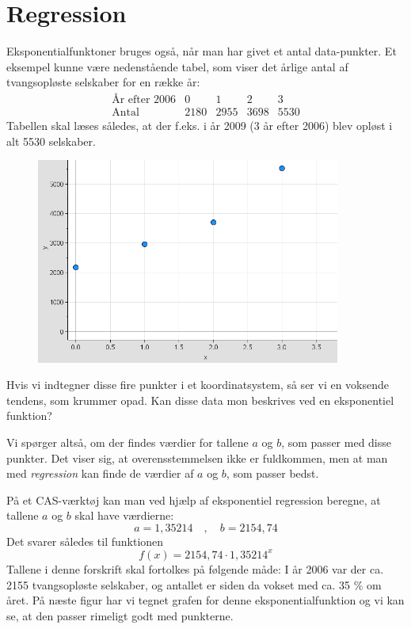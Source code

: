 \documentclass[12pt,oneside,a4paper]{article}
\theoremstyle{plain}
\begin{document}
\section*{Regression}
Eksponentialfunktoner bruges også, når man har givet et antal
data-punkter. Et eksempel kunne være nedenstående tabel, som viser det årlige
antal af tvangsopløste selskaber for en række år:
$$
\begin{array}{l|c|c|c|c}
    \mbox{År efter 2006} & 0 & 1 & 2 & 3 \\
    \hline
    \mbox{Antal} & 2180 & 2955 & 3698 & 5530
\end{array}
$$
Tabellen skal læses således, at der f.eks. i år 2009 (3 år efter 2006) blev
opløst i alt 5530 selskaber.

\begin{figure}[ht]
    \centering
    \includegraphics[width=10cm]{eksp-eks1}
\end{figure}

Hvis vi indtegner disse fire punkter i et koordinatsystem, så ser vi en
voksende tendens, som krummer opad. Kan disse data mon beskrives ved en
eksponentiel funktion?

Vi spørger altså, om der findes værdier for tallene $a$ og $b$, som passer med
disse punkter. Det viser sig, at overensstemmelsen ikke er fuldkommen, men at man
med {\em regression} kan finde de værdier af $a$ og $b$, som passer bedst.

På et CAS-værktøj kan man ved hjælp af eksponentiel regression beregne, at
tallene $a$ og $b$ skal have værdierne: 
$$
a = 1,35214\quad,\quad b = 2154,74
$$
Det svarer således til funktionen 
$$
f(x) = 2154,74 \cdot 1,35214 ^x
$$
Tallene i denne forskrift skal fortolkes på følgende måde: I år 2006 var der
ca. 2155 tvangsopløste selskaber, og antallet er siden da vokset med ca. 35 \%
om året.  På næste figur har vi tegnet grafen for denne eksponentialfunktion
og vi kan se, at den passer rimeligt godt med punkterne.
\end{document}
